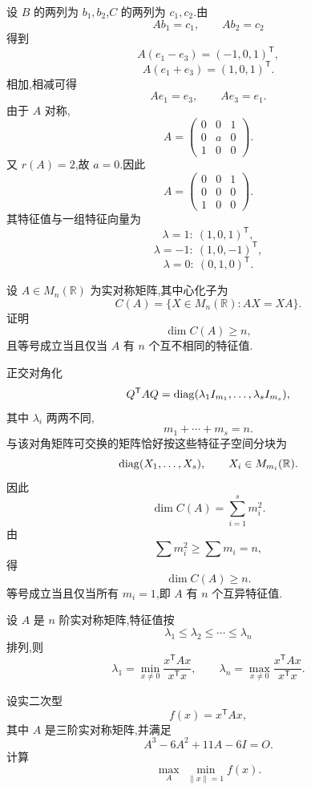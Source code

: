 \begin{solution}
设 $B$ 的两列为 $b_1,b_2$,$C$ 的两列为 $c_1,c_2$.由
\[
Ab_1=c_1,\qquad Ab_2=c_2
\]
得到
\[
A(e_1-e_3)=(-1,0,1)^{\mathsf T},
\]
\[
A(e_1+e_3)=(1,0,1)^{\mathsf T}.
\]
相加,相减可得
\[
Ae_1=e_3,\qquad Ae_3=e_1.
\]
由于 $A$ 对称,
\[
A=
\begin{pmatrix}
0&0&1\\
0&a&0\\
1&0&0
\end{pmatrix}.
\]
又 $r(A)=2$,故 $a=0$.因此
\[
\boxed{
A=
\begin{pmatrix}
0&0&1\\
0&0&0\\
1&0&0
\end{pmatrix}.
}
\]
其特征值与一组特征向量为
\[
\lambda=1:\ (1,0,1)^{\mathsf T},
\]
\[
\lambda=-1:\ (1,0,-1)^{\mathsf T},
\]
\[
\lambda=0:\ (0,1,0)^{\mathsf T}.
\]
\end{solution}


\begin{example}
设 $A\in M_n(\mathbb{R})$ 为实对称矩阵,其中心化子为
\[
C(A)=\{X\in M_n(\mathbb{R}):AX=XA\}.
\]
证明
\[
\dim C(A)\ge n,
\]
且等号成立当且仅当 $A$ 有 $n$ 个互不相同的特征值.
\end{example}
\exampleblank

\begin{solution}
正交对角化
\[
Q^{\mathsf T}AQ
=
\operatorname{diag}(
\lambda_1I_{m_1},
\ldots,
\lambda_sI_{m_s}
),
\]
其中 $\lambda_i$ 两两不同,
\[
m_1+\cdots+m_s=n.
\]
与该对角矩阵可交换的矩阵恰好按这些特征子空间分块为
\[
\operatorname{diag}(X_1,\ldots,X_s),
\qquad
X_i\in M_{m_i}(\mathbb{R}).
\]
因此
\[
\dim C(A)=\sum\limits_{i=1}^{s}m_i^2.
\]
由
\[
\displaystyle\sum m_i^2\ge\sum m_i=n,
\]
得
\[
\dim C(A)\ge n.
\]
等号成立当且仅当所有 $m_i=1$,即 $A$ 有 $n$ 个互异特征值.
\end{solution}


\begin{proposition}[\markstar]
设 $A$ 是 $n$ 阶实对称矩阵,特征值按
\[
\lambda_1\le\lambda_2\le\cdots\le\lambda_n
\]
排列,则
\[
\lambda_1
=
\min_{x\neq0}
\dfrac{x^{\mathsf T}Ax}{x^{\mathsf T}x},
\qquad
\lambda_n
=
\max_{x\neq0}
\dfrac{x^{\mathsf T}Ax}{x^{\mathsf T}x}.
\]
\end{proposition}


\begin{example}
设实二次型
\[
f(x)=x^{\mathsf T}Ax,
\]
其中 $A$ 是三阶实对称矩阵,并满足
\[
A^3-6A^2+11A-6I=O.
\]
计算
\[
\max_A\ \min_{\|x\|=1} f(x).
\]
\end{example}
\exampleblank

